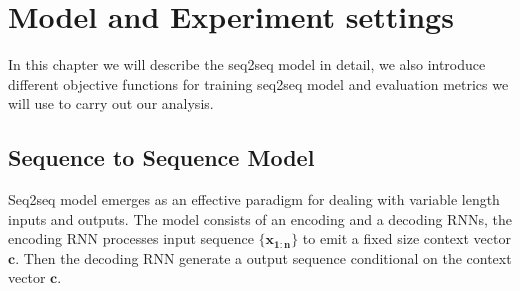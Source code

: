 \chapter{Model and Experiment settings}
\label{chapterlabel3}
In this chapter we will describe the seq2seq model\cite{sutskever2014sequence,cho2014learning} in detail, we also introduce different objective functions for training seq2seq model and evaluation metrics we will use to carry out our analysis.
\section{Sequence to Sequence Model}
Seq2seq model\cite{sutskever2014sequence,cho2014learning} emerges as an effective paradigm for dealing with variable length inputs and outputs.
The model consists of an encoding and a decoding RNNs, the encoding RNN processes input sequence $ \{\mathbf{x_{1:n}}\}$ to emit a fixed size context vector $\mathbf{c}$. 
Then the decoding RNN generate a output sequence conditional on the context vector $\mathbf{c}$\cite{Goodfellow2016Book}.
